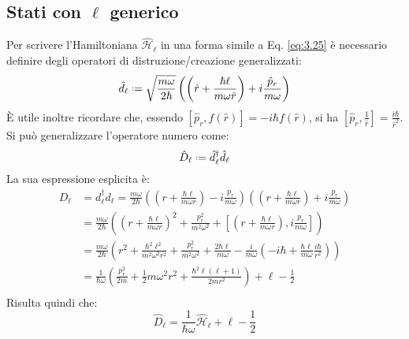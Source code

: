 \subsection{Stati con \texorpdfstring{$ \ell $}{TEXT} generico}

Per scrivere l'Hamiltoniana $ \hat{\mathcal{H}}_{\ell} $ in una forma simile a Eq. \ref{eq:3.25} è necessario definire degli operatori di distruzione/creazione generalizzati:
\begin{equation}
	\hat{d}_{\ell} \defeq \sqrt{\frac{m\omega}{2\hbar}} \left( \left( \hat{r} + \frac{\hbar\ell}{m\omega\hat{r}} \right) + i \frac{\hat{p}_r}{m\omega} \right)
	\label{eq:3.28}
\end{equation}
È utile inoltre ricordare che, essendo $ \left[ \hat{p}_r, f(\hat{r}) \right] = -i\hbar f(\hat{r}) $, si ha $ \left[ \hat{p}_r, \frac{1}{\hat{r}} \right] = \frac{i\hbar}{\hat{r}^2} $.\\
Si può generalizzare l'operatore numero come:
\begin{equation}
	\hat{D}_{\ell} \defeq \hat{d}_{\ell}^{\dagger} \hat{d}_{\ell}
	\label{eq:3.29}
\end{equation}
La sua espressione esplicita è:
\begin{equation*}
	\begin{split}
		D_{\ell}
		&= d_{\ell}^{\dagger} d_{\ell} = \frac{m\omega}{2\hbar} \left( \left( r + \frac{\hbar\ell}{m\omega r} \right) - i \frac{p_r}{m\omega} \right) \left( \left( r + \frac{\hbar\ell}{m\omega r} \right) + i \frac{p_r}{m\omega} \right)\\
		&= \frac{m\omega}{2\hbar} \left( \left( r + \frac{\hbar\ell}{m\omega r} \right)^2 + \frac{p_r^2}{m^2 \omega^2} + \left[ \left( r + \frac{\hbar\ell}{m\omega r} \right), i \frac{p_r}{m\omega} \right] \right)\\
		&= \frac{m\omega}{2\hbar} \left( r^2 + \frac{\hbar^2\ell^2}{m^2 \omega^2 r^2} + \frac{p_r^2}{m^2 \omega^2} + \frac{2\hbar\ell}{m\omega} - \frac{i}{m\omega} \left( -i\hbar + \frac{\hbar\ell}{m\omega} \frac{i\hbar}{r^2} \right) \right)\\
		&= \frac{1}{\hbar\omega} \left( \frac{p_r^2}{2m} + \frac{1}{2}m\omega^2 r^2 + \frac{\hbar^2 \ell (\ell + 1)}{2mr^2} \right) + \ell - \frac{1}{2}\\
	\end{split}
\end{equation*}
Risulta quindi che:
\begin{equation}
	\hat{D}_{\ell} = \frac{1}{\hbar\omega} \hat{\mathcal{H}}_{\ell} + \ell - \frac{1}{2}
	\label{eq:3.30}
\end{equation}
